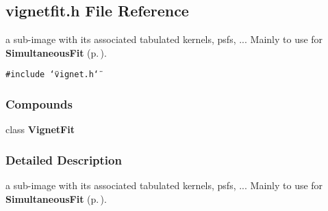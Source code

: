 \subsection{vignetfit.h File Reference}
\label{vignetfit_h}
a sub-image with its associated tabulated kernels, psfs, ... Mainly to use for {\bf Simultaneous\-Fit} {\rm (p.\,\pageref{class_simultaneousfit})}. 


{\tt \#include \char`\"{}vignet.h\char`\"{}}\par
\subsubsection*{Compounds}
\begin{CompactItemize}
\item 
class {\bf Vignet\-Fit}
\end{CompactItemize}


\subsubsection{Detailed Description}
a sub-image with its associated tabulated kernels, psfs, ... Mainly to use for {\bf Simultaneous\-Fit} {\rm (p.\,\pageref{class_simultaneousfit})}.



